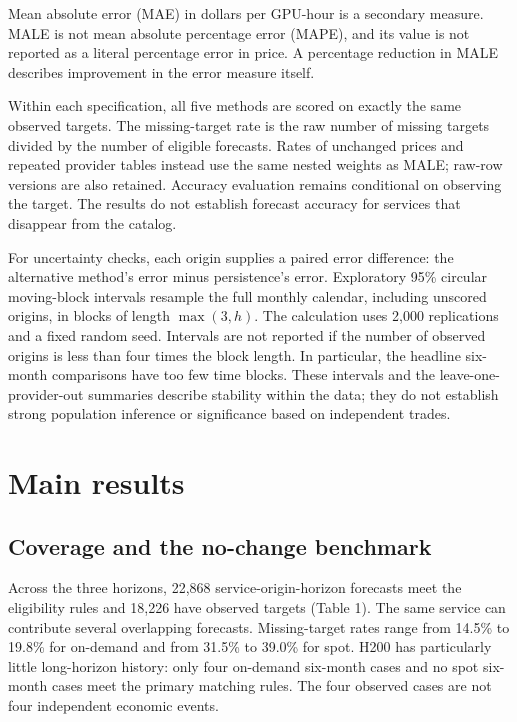 \documentclass[10pt]{article}
\begin{document}
Mean absolute error (MAE) in dollars per GPU-hour is a secondary measure. MALE is not mean absolute percentage error (MAPE), and its value is not reported as a literal percentage error in price. A percentage reduction in MALE describes improvement in the error measure itself.

Within each specification, all five methods are scored on exactly the same observed targets. The missing-target rate is the raw number of missing targets divided by the number of eligible forecasts. Rates of unchanged prices and repeated provider tables instead use the same nested weights as MALE; raw-row versions are also retained. Accuracy evaluation remains conditional on observing the target. The results do not establish forecast accuracy for services that disappear from the catalog.

For uncertainty checks, each origin supplies a paired error difference: the alternative method's error minus persistence's error. Exploratory 95\% circular moving-block intervals resample the full monthly calendar, including unscored origins, in blocks of length $\max(3,h)$. The calculation uses 2,000 replications and a fixed random seed. Intervals are not reported if the number of observed origins is less than four times the block length. In particular, the headline six-month comparisons have too few time blocks. These intervals and the leave-one-provider-out summaries describe stability within the data; they do not establish strong population inference or significance based on independent trades.

\section{Main results}

\subsection{Coverage and the no-change benchmark}

Across the three horizons, 22,868 service-origin-horizon forecasts meet the eligibility rules and 18,226 have observed targets (Table 1). The same service can contribute several overlapping forecasts. Missing-target rates range from 14.5\% to 19.8\% for on-demand and from 31.5\% to 39.0\% for spot. H200 has particularly little long-horizon history: only four on-demand six-month cases and no spot six-month cases meet the primary matching rules. The four observed cases are not four independent economic events.
\end{document}

